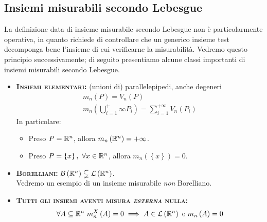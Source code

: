 \subsection{Insiemi misurabili secondo Lebesgue}
La definizione data di insieme misurabile secondo Lebesgue non è particolarmente operativa, in quanto richiede di controllare che un generico insieme test decomponga bene l'insieme di cui verificarne la misurabilità. Vedremo questo principio successivamente; di seguito presentiamo alcune classi importanti di insiemi misurabili secondo Lebesgue.
\begin{itemize}
	\item \textsc{\textbf{Insiemi elementari:}} (unioni di) parallelepipedi, anche degeneri
	\begin{gather*}
		m_n\left(P\right)=V_n\left(P\right)\\
		m_n\left(\bigcup_{i=1}^+\infty P_i\right)=\sum_{i=1}^{+\infty}V_n\left(P_i\right)
	\end{gather*}
In particolare:
\begin{itemize}
	\item Preso $P=\mathbb{R}^n$, allora $m_n\left(\mathbb{R}^n\right)=+\infty$.
	\item Preso $P=\left\{x\right\},\ \forall x\in\mathbb{R}^n$, allora $m_n\left(\left\{x\right\}\right)=0$.
\end{itemize}
\item \textsc{\textbf{Borelliani:}} $\mathcal{B}\left(\mathbb{R}^n\right)\subsetneqq\mathcal{L}\left(\mathbb{R}^n\right)$.\\
Vedremo un esempio di un insieme misurabile \textit{non} Borelliano.
\item \textsc{\textbf{Tutti gli insiemi aventi misura \textit{esterna} nulla:}}
\begin{equation*}
	\forall A\subseteq \realset^n\ m_n^X\left(A\right)=0\implies A\in\mathcal{L}\left(\realset^n\right)\text{ e }m_n\left(A\right)=0
\end{equation*}
\end{itemize}

